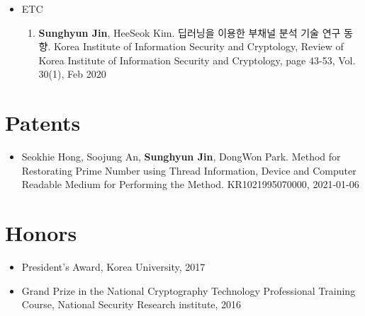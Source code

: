 \documentclass[a4paper,20pt]{article}
\begin{document}
\begin{itemize}
\begin{enumerate}
            \vspace{-2pt}
        \end{enumerate}
    \item {ETC}
        \vspace{-6pt}
        \begin{enumerate}
            \item {\textbf{Sunghyun Jin}, HeeSeok Kim. 딥러닝을 이용한 부채널 분석 기술 연구 동향. Korea Institute of Information Security and Cryptology, Review of Korea Institute of Information Security and Cryptology, page 43-53, Vol. 30(1), Feb 2020}
            \vspace{-2pt}
        \end{enumerate}
\end{itemize}



\section{\textbf{Patents}}
\begin{itemize}
    \item {Seokhie Hong, Soojung An, \textbf{Sunghyun Jin}, DongWon Park. Method for Restorating Prime Number using Thread Information, Device and Computer Readable Medium for Performing the Method. KR1021995070000, 2021-01-06}
    \vspace{-4pt}
\end{itemize}



\section{\textbf{Honors}}
\begin{itemize}
    \item {President's Award, Korea University, 2017}
    \vspace{-4pt}
    \item {Grand Prize in the National Cryptography Technology Professional Training Course, National Security Research institute, 2016}
\end{itemize}











\iffalse


\newcommand{\resumeItem}[2]{
  \item\small{
    \textbf{#1}{: #2 \vspace{-2pt}}
  }
}
\end{document}
